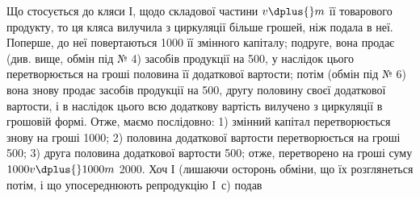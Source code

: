 Що стосується до кляси І, щодо складової частини $v \dplus{} m$ її товарового
продукту, то ця кляса вилучила з циркуляції більше грошей, ніж подала
в неї. Поперше, до неї повертаються 1000 її змінного капіталу;
подруге, вона продає (див. вище, обмін під № 4) засобів продукції
на 500, у наслідок цього перетворюється на гроші половина
її додаткової вартости; потім (обмін під № 6) вона знову продає засобів
продукції на 500, другу половину своєї додаткової вартости,
і в наслідок цього всю додаткову вартість вилучено з циркуляції в грошовій
формі. Отже, маємо послідовно: 1) змінний капітал перетворюється
знову на гроші \deq{} 1000; 2) половина додаткової вартости перетворюється
на гроші \deq{} 500; 3) друга половина додаткової
вартости \deq{} 500; отже, перетворено на гроші суму
$1000 v \dplus{} 1000 m$ \deq{} 2000. Хоч І (лишаючи осторонь обміни,
що їх розглянеться потім, і що упосереднюють репродукцію І~$с$) подав
\parbreak{}  %
